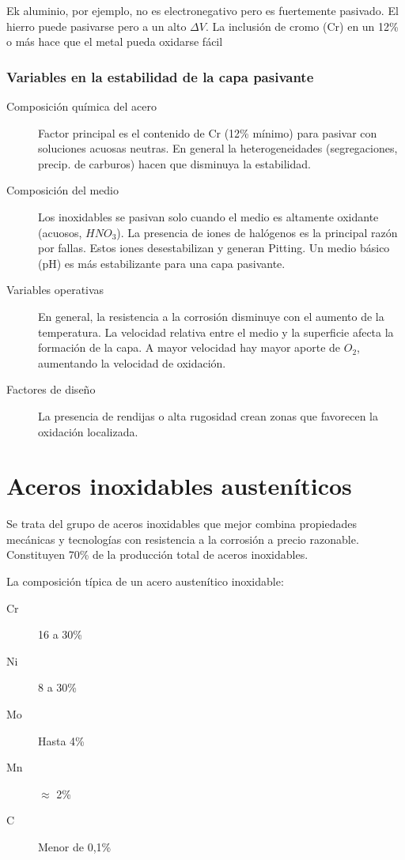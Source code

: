 Ek aluminio, por ejemplo, no es electronegativo pero es fuertemente pasivado. El hierro puede pasivarse pero a un alto $\Delta V$. La inclusión de cromo (Cr) en un 12\% o más hace que el metal pueda oxidarse fácil

\subsubsection*{Variables en la estabilidad de la capa pasivante}
\begin{description}
	\item[Composición química del acero] Factor principal es el contenido de Cr (12\% mínimo) para pasivar con soluciones acuosas neutras. En general la heterogeneidades (segregaciones, precip. de carburos) hacen que disminuya la estabilidad.
	\item[Composición del medio] Los inoxidables se pasivan solo cuando el medio es altamente oxidante (acuosos, $HNO_3$). La presencia de iones de halógenos es la principal razón por fallas. Estos iones desestabilizan y generan Pitting. Un medio básico (pH) es más estabilizante para una capa pasivante.
	\item[Variables operativas] En general, la resistencia a la corrosión disminuye con el aumento de la temperatura. La velocidad relativa entre el medio y la superficie afecta la formación de la capa. A mayor velocidad hay mayor aporte de $O_2$, aumentando la velocidad de oxidación.
	\item[Factores de diseño] La presencia de rendijas o alta rugosidad crean zonas que favorecen la oxidación localizada.
\end{description}

\section{Aceros inoxidables austeníticos}
Se trata del grupo de aceros inoxidables que mejor combina propiedades mecánicas y tecnologías con resistencia a la corrosión a precio razonable. Constituyen 70\% de la producción total de aceros inoxidables. 

La composición típica de un acero austenítico inoxidable:
\begin{description}
	\item[Cr] 16 a 30\%
	\item[Ni] 8 a 30\%
	\item[Mo] Hasta 4\%
	\item[Mn] $\approx$ 2\%
	\item[C] Menor de 0,1\%
\end{description}


